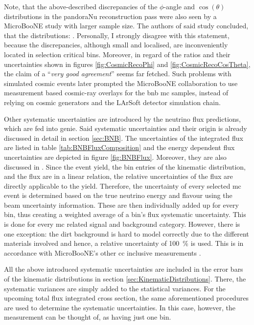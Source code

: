 Note, that the above-described discrepancies of the $\phi$-angle and $\cos{(\theta)}$ distributions in the pandoraNu reconstruction pass were also seen by a MicroBooNE study with larger sample size. The authors of said study concluded, that the distributions: \cite[\textit{generally show very good agreement between data and MC simulation}]{MicroBooNECosmicMCPN}. Personally, I strongly disagree with this statement, because the discrepancies, although small and localised, are inconveniently located in selection critical bins. Moreover, in regard of the ratios and their uncertainties shown in figures \ref{fig:CosmicRecoPhi} and \ref{fig:CosmicRecoCosTheta}, the claim of a ``\textit{very good agreement}'' seems far fetched. Such problems with simulated cosmic events later prompted the MicroBooNE collaboration to use measurement based cosmic-ray overlays for the \gls{bnb} \gls{mc} samples, instead of relying on cosmic generators and the \gls{LArSoft} detector simulation chain.

Other systematic uncertainties are introduced by the neutrino flux predictions, which are fed into \gls{genie}. Said systematic uncertainties and their origin is already discussed in detail in section \ref{sec:BNB}. The uncertainties of the integrated flux are listed in table \ref{tab:BNBFluxComposition} and the energy dependent flux uncertainties are depicted in figure \ref{fig:BNBFlux}. Moreover, they are also discussed in \cite{BNBBeamFlux,BNBBeamUncertainty}. Since the event yield, \ie the bin entries of the kinematic distribution, and the flux are in a linear relation, the relative uncertainties of the flux are directly applicable to the yield. Therefore, the uncertainty of every selected \gls{mc} event is determined based on the true neutrino energy and flavour using the beam uncertainty information. These are then individually added up for every bin, thus creating a weighted average of a bin's flux systematic uncertainty. This is done for every \gls{mc} related signal and background category. However, there is one exception: the dirt background is hard to model correctly due to the different materials involved and hence, a relative uncertainty of \SI{100}{\percent} is used. This is in accordance with MicroBooNE's other \gls{cc} inclusive measurements \cite{CRTThomasPhD,MicroBooNEFirstCCInclPublished}.

All the above introduced systematic uncertainties are included in the error bars of the kinematic distributions in section \ref{sec:KinematicDistributions}. There, the systematic variances are simply added to the statistical variances. For the upcoming total flux integrated cross section, the same aforementioned procedures are used to determine the systematic uncertainties. In this case, however, the measurement can be thought of, as having just one bin.


